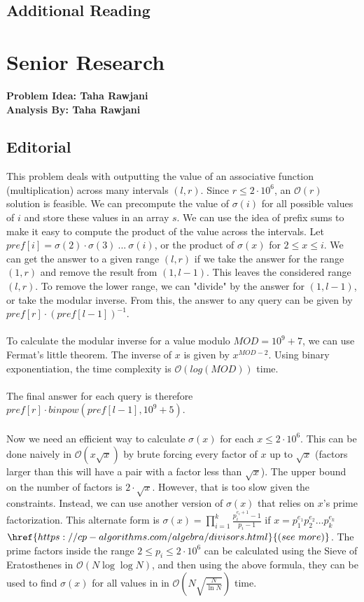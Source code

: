 \documentclass{article}
\begin{document}
\subsection{Additional Reading}
\newpage
\section{Senior Research}
\textbf{Problem Idea: Taha Rawjani\\Analysis By: Taha Rawjani}
\subsection{Editorial}
This problem deals with outputting the value of an associative function (multiplication) across many intervals $(l, r)$. Since $r \leq 2\cdot10^6$, an $\mathcal{O}(r)$ solution is feasible. We can precompute the value of $\sigma(i)$ for all possible values of $i$ and store these values in an array $s$. We can use the idea of prefix sums to make it easy to compute the product of the value across the intervals. Let $pref[i] = \sigma(2) \cdot \sigma(3)\ ...\ \sigma(i)$, or the product of $\sigma(x)$ for $2\leq x \leq i$. We can get the answer to a given range $(l, r)$ if we take the answer for the range $(1, r)$ and remove the result from $(1, l - 1)$. This leaves the considered range $(l, r)$. To remove the lower range, we can "divide" by the answer for $(1, l - 1)$, or take the modular inverse. From this, the answer to any query can be given by $pref[r] \cdot (pref[l-1])^{-1}$. 
\\\\
To calculate the modular inverse for a value modulo $MOD = 10^9 + 7$, we can use Fermat's little theorem. The inverse of $x$ is given by $x^{MOD-2}$. Using binary exponentiation, the time complexity is $\mathcal{O}(log(MOD))$ time.
\\
\\The final answer for each query is therefore $pref[r] \cdot binpow(pref[l-1], 10^9+5)$. 
\\\\
Now we need an efficient way to calculate $\sigma(x)$ for each $x \leq 2\cdot10^6$. This can be done naively in $\mathcal{O}(x\sqrt{x})$ by brute forcing every factor of $x$ up to $\sqrt{x}$ (factors larger than this will have a pair with a factor less than $\sqrt{x}$). The upper bound on the number of factors is $2\cdot\sqrt{x}$. However, that is too slow given the constraints. Instead, we can use another version of $\sigma(x)$ that relies on $x$'s prime factorization. This alternate form is $\sigma(x) = \prod_{i=1}^{k} \frac{p_i^{e_i+1} - 1}{p_i - 1}$ if $x = p_1^{e_1} p_2^{e_2} \dots p_k^{e_k}$ $\href{https://cp-algorithms.com/algebra/divisors.html}{(see\ more)}$. The prime factors inside the range $2 \leq p_i\leq 2\cdot10^6$ can be calculated using the Sieve of Eratosthenes in $\mathcal{O}(N\log\log N)$, and then using the above formula, they can be used to find $\sigma(x)$ for all values in  in $\mathcal{O}(N\sqrt{\frac{N}{\ln N}})$ time. 
\end{document}
